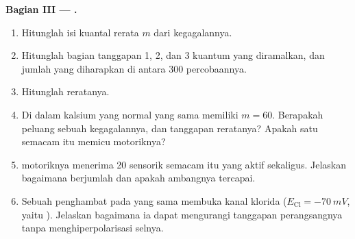 \begin{problem}
\medskip
\noindent\textbf{Bagian III --- .}
\begin{enumerate}[resume]
  \item Hitunglah isi kuantal rerata $m$ dari kegagalannya.
  \item Hitunglah bagian tanggapan 1, 2, dan 3 kuantum yang
        diramalkan, dan jumlah yang diharapkan di antara 300
        percobaannya.
  \item Hitunglah  reratanya.
  \item Di dalam kalsium yang normal  yang sama memiliki
        $m = 60$. Berapakah peluang sebuah kegagalannya, dan tanggapan
        reratanya? Apakah satu  semacam itu memicu 
        motoriknya?
  \item {} motoriknya menerima \num{20}  sensorik semacam
        itu yang aktif sekaligus. Jelaskan bagaimana 
        berjumlah dan apakah ambangnya tercapai.
  \item Sebuah  penghambat pada  yang sama membuka kanal
        klorida ($E_{\mathrm{Cl}} = \qty{-70}{mV}$, yaitu ). Jelaskan bagaimana ia dapat mengurangi tanggapan
        perangsangnya tanpa menghiperpolarisasi selnya.
\end{enumerate}


\end{problem}
